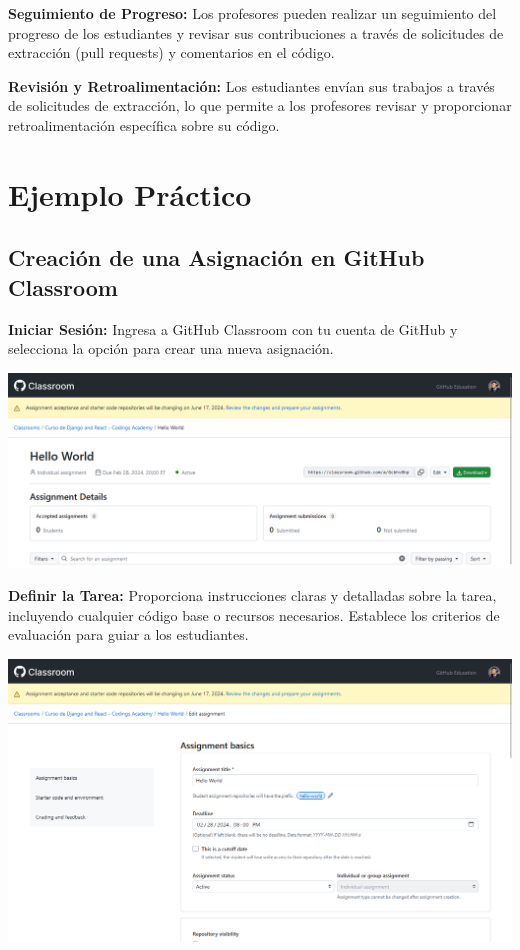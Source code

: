 \documentclass[
  a4paper,
  DIV=11,
  numbers=noendperiod,
  onepage,
  openany]{scrreprt}
\begin{document}
\textbf{Seguimiento de Progreso:} Los profesores pueden realizar un
seguimiento del progreso de los estudiantes y revisar sus contribuciones
a través de solicitudes de extracción (pull requests) y comentarios en
el código.

\textbf{Revisión y Retroalimentación:} Los estudiantes envían sus
trabajos a través de solicitudes de extracción, lo que permite a los
profesores revisar y proporcionar retroalimentación específica sobre su
código.

\section{Ejemplo Práctico}\label{ejemplo-pruxe1ctico}

\subsection{Creación de una Asignación en GitHub Classroom
📒}\label{creaciuxf3n-de-una-asignaciuxf3n-en-github-classroom}

\textbf{Iniciar Sesión:} Ingresa a GitHub Classroom con tu cuenta de
GitHub y selecciona la opción para crear una nueva asignación.

\begin{center}
\includegraphics{unidades/unidad1/images/paste-2.png}
\end{center}

\textbf{Definir la Tarea:} Proporciona instrucciones claras y detalladas
sobre la tarea, incluyendo cualquier código base o recursos necesarios.
Establece los criterios de evaluación para guiar a los estudiantes.

\begin{center}
\includegraphics{unidades/unidad1/images/paste-1.png}
\end{center}
\end{document}

